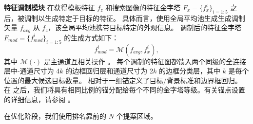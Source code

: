 \textbf{特征调制模块} 在获得模板特征 $f_{z}$ 和搜索图像的特征金字塔 $F_{x} = \{f_{x}^i\}_{i=1:5}$ 之后，被调制以生成特定于目标的特征。
具体而言，使用全局平均池生成生成调制矢量 $f_{avg}$ 从 $f_{z}$，该全局平均池携带目标特定的外观信息。
调制后的特征金字塔 $F_{mod} = \{f_{mod}^i\}_{i=1:5}$ 的生成方式如下：
\begin{equation}
    f_{mod}^i = \mathcal{M}(f_{avg}, f^i_x),
\end{equation}
其中 $\mathcal M(\cdot)$ 是主通道互相关操作 \cite{SiamRPN++}。
每个调制的特征图都馈入两个同级的全连接层中-通道尺寸为 4$k$ 的边框回归层和通道尺寸为 2$k$ 的边框分类层，其中 $k$ 是每个位置的最大候选目标数量。
相对于一组锚定义了目标/背景标准和边界框回归。
在 \cite{lin2017feature} 之后，我们将具有相同比例的锚分配给每个不同的金字塔等级。有关锚点设置的详细信息，请参阅 \cite{lin2017feature}。

在优化阶段，我们使用排名靠前的 $N$ 个提案区域。

